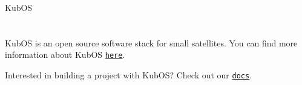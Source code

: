 Kub\+OS \section*{\href{https://circleci.com/gh/kubostech/kubos}{\tt } }

Kub\+OS is an open source software stack for small satellites. You can find more information about Kub\+OS \href{http://kubos.co}{\tt here}.

Interested in building a project with Kub\+OS? Check out our \href{http://docs.kubos.co}{\tt docs}. 